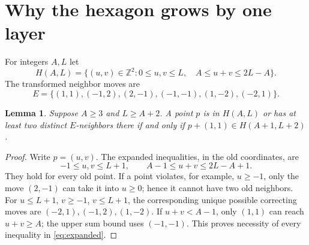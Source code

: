 \documentclass[11pt]{article}
\newtheorem{lemma}[theorem]{Lemma}
\newcommand{\Z}{\mathbb Z}
\begin{document}
\section{Why the hexagon grows by one layer}
For integers $A,L$ let
\[
 H(A,L)=\{(u,v)\in\Z^2:0\leq u,v\leq L,\quad
 A\leq u+v\leq2L-A\}.
\]
The transformed neighbor moves are
\[
 E=\{(1,1),(-1,2),(2,-1),(-1,-1),(1,-2),(-2,1)\}.
\]
\begin{lemma}\label{lem:boundary}
Suppose $A\geq3$ and $L\geq A+2$. A point $p$ is in
$H(A,L)$ or has at least two distinct $E$-neighbors there if and only if
$p+(1,1)\in H(A+1,L+2)$.
\end{lemma}
\begin{proof}
Write $p=(u,v)$. The expanded inequalities, in the old coordinates, are
\begin{equation}\label{eq:expanded}
 -1\leq u,v\leq L+1,\qquad A-1\leq u+v\leq2L-A+1.
\end{equation}
They hold for every old point. If a point violates, for example, $u\geq-1$,
only the move $(2,-1)$ can take it into $u\geq0$; hence it cannot have two
old neighbors. For $u\leq L+1$, $v\geq-1$, $v\leq L+1$, the corresponding
unique possible correcting moves are $(-2,1),(-1,2),(1,-2)$.
If $u+v<A-1$, only $(1,1)$ can reach $u+v\geq A$; the upper sum bound
uses $(-1,-1)$. This proves necessity of every inequality in
\eqref{eq:expanded}.


\end{proof}
\end{document}
